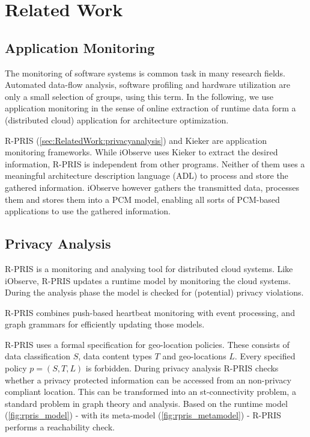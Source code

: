 \chapter{Related Work}
\label{ch:RelatedWork}


\section{Application Monitoring}
\label{sec:RelatedWork:appl_mon}

The monitoring of software systems is common task in many research fields. Automated data-flow analysis, software profiling and hardware utilization are only a small selection of groups, using this term. In the following, we use application monitoring in the sense of online extraction of runtime data form a (distributed cloud) application for architecture optimization.

R-PRIS (\autoref{sec:RelatedWork:privacyanalysis}) and Kieker are application monitoring frameworks. While iObserve uses Kieker to extract the desired information, R-PRIS is independent from other programs. Neither of them uses a meaningful architecture description language (ADL) to process and store the gathered information. iObserve however gathers the transmitted data, processes them and stores them into a PCM model, enabling all sorts of PCM-based applications to use the gathered information.


\section{Privacy Analysis}
\label{sec:RelatedWork:privacyanalysis}

R-PRIS is a monitoring and analysing tool for distributed cloud systems. Like iObserve, R-PRIS updates a runtime model by monitoring the cloud systems. During the analysis phase the model is checked for (potential) privacy violations.

R-PRIS combines push-based heartbeat monitoring with event processing, and graph grammars for efficiently updating those models.\cite{Schmieders.}

R-PRIS uses a formal specification for geo-location policies. These consists of data classification $S$, data content types $T$ and geo-locations $L$. Every specified policy $p = (S, T, L)$ is forbidden.
During privacy analysis R-PRIS checks whether a privacy protected information can be accessed from an non-privacy compliant location. This can be transformed into an st-connectivity problem, a standard problem in graph theory and analysis. Based on the runtime model (\autoref{fig:rpris_model}) - with its meta-model (\autoref{fig:rpris_metamodel}) - R-PRIS performs a reachability check.\cite{Schmieders.2015} 

